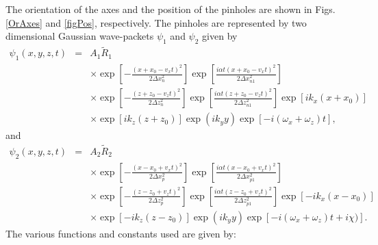 \documentclass[12pt]{article}       %
\begin{document}
The orientation of the axes and the position of the pinholes are shown in Figs. \ref{OrAxes} and \ref{figPos}, respectively.
The pinholes are represented by two dimensional Gaussian wave-packets  $\psi_1$ and $\psi_2$ given by
\begin{eqnarray}
\psi_1(x,y,z,t)&=&A_1\tilde{R}_{1}\nonumber\\
&&\times\exp\left[{-  \frac{(x+x_0-v_x t)^2}{2\Delta x_n^2}}\right]\exp\left[{\frac{i\alpha t(x+x_0-v_x t)^2}{2\Delta x_{n1}^2}}\right]\nonumber\\
&&\times\exp\left[{-  \frac{(z+z_0-v_z t)^2}{2\Delta z_n^2}}\right] \exp\left[{\frac{i\alpha t(z+z_0-v_z t)^2}{2\Delta z_{n1}^2}}\right]\exp\left[ik_x(x+x_0)\right]\nonumber\\
&&\times\exp\left[ik_z(z+z_0)\right]\exp\left(ik_y y\right)\exp\left[-i(\omega_x+\omega_z) t\right],\label{psi1}
\end{eqnarray}
and
\begin{eqnarray}
\psi_2(x,y,z,t)&=&A_2\tilde{R}_{2}\nonumber\\
&&\times\exp\left[{-  \frac{(x-x_0+v_x t)^2}{2\Delta x_p^2}}\right]\exp\left[{\frac{i\alpha t(x-x_0+v_x t)^2}{2\Delta x_{p1}^2}}\right]\nonumber\\
&&\times\exp\left[{-  \frac{(z-z_0+v_z t)^2}{2\Delta z_p^2}}\right] \exp\left[{\frac{i\alpha t(z-z_0+v_z t)^2}{2\Delta z_{p1}^2}}\right]\exp\left[-ik_x(x-x_0)\right]\nonumber\\
&&\times\exp\left[-ik_z(z-z_0)\right]\exp\left(ik_yy\right)\exp\left[-i(\omega_x+\omega_z) t+i\chi)\right].\label{psi2}
\end{eqnarray}
The various functions and constants used are given by:
\end{document}
